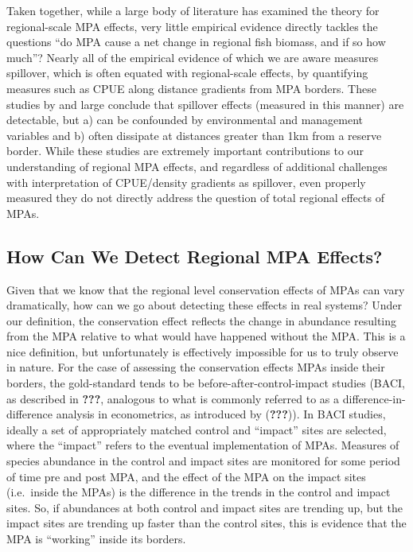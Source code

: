 \documentclass[twoside,12pt,final]{ucthesis-CA2012}
\begin{document}
\begin{ucmainmatter}
Taken together, while a large body of literature has examined the theory
for regional-scale MPA effects, very little empirical evidence directly
tackles the questions ``do MPA cause a net change in regional fish
biomass, and if so how much''? Nearly all of the empirical evidence of
which we are aware measures spillover, which is often equated with
regional-scale effects, by quantifying measures such as CPUE along
distance gradients from MPA borders. These studies by and large conclude
that spillover effects (measured in this manner) are detectable, but a)
can be confounded by environmental and management variables and b) often
dissipate at distances greater than 1km from a reserve border. While
these studies are extremely important contributions to our understanding
of regional MPA effects, and regardless of additional challenges with
interpretation of CPUE/density gradients as spillover, even properly
measured they do not directly address the question of total regional
effects of MPAs.

\subsection{How Can We Detect Regional MPA
Effects?}\label{how-can-we-detect-regional-mpa-effects}

Given that we know that the regional level conservation effects of MPAs
can vary dramatically, how can we go about detecting these effects in
real systems? Under our definition, the conservation effect reflects the
change in abundance resulting from the MPA relative to what would have
happened without the MPA. This is a nice definition, but unfortunately
is effectively impossible for us to truly observe in nature. For the
case of assessing the conservation effects MPAs inside their borders,
the gold-standard tends to be before-after-control-impact studies (BACI,
as described in {\textbf{???}}, analogous to what is commonly referred
to as a difference-in-difference analysis in econometrics, as introduced
by ({\textbf{???}})). In BACI studies, ideally a set of appropriately
matched control and ``impact'' sites are selected, where the ``impact''
refers to the eventual implementation of MPAs. Measures of species
abundance in the control and impact sites are monitored for some period
of time pre and post MPA, and the effect of the MPA on the impact sites
(i.e.~inside the MPAs) is the difference in the trends in the control
and impact sites. So, if abundances at both control and impact sites are
trending up, but the impact sites are trending up faster than the
control sites, this is evidence that the MPA is ``working'' inside its
borders.


\end{ucmainmatter}
\end{document}
